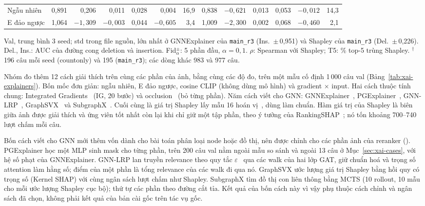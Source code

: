 \begin{table}[t]
\begin{tabular*}{\textwidth}{@{\extracolsep{\fill}}lrrrrrrrrrrrr@{}}
    Ngẫu nhiên & 0,891 & 0,206 & 0,011 & 0,028 & 0,004 & 16,9 & 0,838 & $-0{,}621$ & 0,013 & 0,053 & $-0{,}012$ & 14,3 \\
    E đảo ngược & 1,064 & $-1{,}309$ & $-0{,}003$ & 0,044 & $-0{,}605$ & 3,4 & 1,009 & $-2{,}300$ & 0,002 & 0,068 & $-0{,}460$ & 2,1 \\
    \bottomrule
  \end{tabular*}
  \par\smallskip
  {\scriptsize\raggedright
    Val, trung bình 3 seed; std trong file nguồn, lớn nhất ở GNNExplainer của \texttt{main\_r3} (Ins.\ $\pm$\,0,951) và Shapley của \texttt{main\_r3} (Del.\ $\pm$\,0,226).
    Del., Ins.: AUC của đường cong deletion và insertion.
    Fid$_{\alpha}^{\pm}$: 5 phần đầu, $\alpha=0{,}1$.
    $\rho$: Spearman với Shapley; T5: \% top-5 trùng Shapley.
    $^{\dagger}$196 câu mỗi seed (countonly) và 195 (\texttt{main\_r3}); các dòng khác 983 và 977 câu.\par}
\end{table}

Nhóm đo thêm 12 cách giải thích trên cùng các phần của ảnh, bằng cùng các độ đo, trên một mẫu cố định 1\,000 câu val (Bảng~\ref{tab:xai-explainers}).
Bốn mốc đơn giản: ngẫu nhiên, E đảo ngược, cosine CLIP (không dùng mô hình) và gradient $\times$ input.
Hai cách thuộc tính chung: Integrated Gradients~\cite{xai-sundararajan2017ig} (IG, 20 bước) và occlusion~\cite{xai-zeiler2014occlusion} (bỏ từng phần).
Năm cách viết cho GNN: GNNExplainer~\cite{xai-ying2019gnnexplainer}, PGExplainer~\cite{xai-luo2020pgexplainer}, GNN-LRP~\cite{xai-schnake2022gnnlrp}, GraphSVX~\cite{xai-duval2021graphsvx} và SubgraphX~\cite{xai-yuan2021subgraphx}.
Cuối cùng là giá trị Shapley lấy mẫu 16 hoán vị~\cite{xai-castro2009shapley}, dùng làm chuẩn.
Hàm giá trị của Shapley là biên giữa ảnh được giải thích và ứng viên tốt nhất còn lại khi chỉ giữ một tập phần, theo ý tưởng của RankingSHAP~\cite{xai-heuss2025rankingshap}; nó tốn khoảng 700--740 lượt chấm mỗi câu.

Bốn cách viết cho GNN mới thêm vốn dành cho bài toán phân loại node hoặc đồ thị, nên được chỉnh cho các phần ảnh của reranker ().
PGExplainer học một MLP sinh mask cho từng phần, trên 200 câu val nằm ngoài mẫu so sánh và ngoài 13 câu ở Mục~\ref{sec:xai-cases}, với hệ số phạt của GNNExplainer.
GNN-LRP lan truyền relevance theo quy tắc $\varepsilon$~\cite{xai-bach2015lrp} qua các walk của hai lớp GAT, giữ chuẩn hoá và trọng số attention làm hằng số; điểm của một phần là tổng relevance của các walk đi qua nó.
GraphSVX ước lượng giá trị Shapley bằng hồi quy có trọng số (Kernel SHAP) với cùng ngân sách lượt chấm như Shapley.
SubgraphX tìm đồ thị con liên thông bằng MCTS (10 rollout, 10 mẫu cho mỗi ước lượng Shapley cục bộ); thứ tự các phần theo đường cắt tỉa.
Kết quả của bốn cách này vì vậy phụ thuộc cách chỉnh và ngân sách đã chọn, không phải kết quả của bản cài gốc trên tác vụ gốc.

